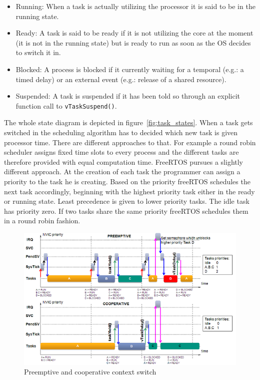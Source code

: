 \begin{itemize}
    \item Running: When a task is actually utilizing the processor it is said to be in the running state.
    \item Ready: A task is said to be ready if it is not utilizing the core at the moment (it is not in the running state) but is ready to run as soon as the OS decides to switch it in.
    \item Blocked: A process is blocked if it currently waiting for a temporal (e.g.: a timed delay) or an external event (e.g.: release of a shared resource).
    \item Suspended: A task is suspended if it has been told so through an explicit function call to \verb+vTaskSuspend()+.
\end{itemize}

The whole state diagram is depicted in figure~\ref{fig:task_states}. When a task gets switched in the scheduling algorithm has to decided which new task is given processor time. There are different approaches to that. For example a round robin scheduler assigns fixed time slots to every process and the different tasks are therefore provided with equal computation time. FreeRTOS pursues a slightly different approach. At the creation of each task the programmer can assign a priority to the task he is creating. Based on the priority freeRTOS schedules the next task accordingly, beginning with the highest priority task either in the ready or running state. Least precedence is given to lower priority tasks. The idle task has priority zero. If two tasks share the same priority freeRTOS schedules them in a round robin fashion.

\begin{figure}[htbp]
 \centering
 \includegraphics[width=\linewidth]{./figures/preemptive_cooperative.png}
 \caption{Preemptive and cooperative context switch}
 \label{fig:context_switch}
\end{figure}


